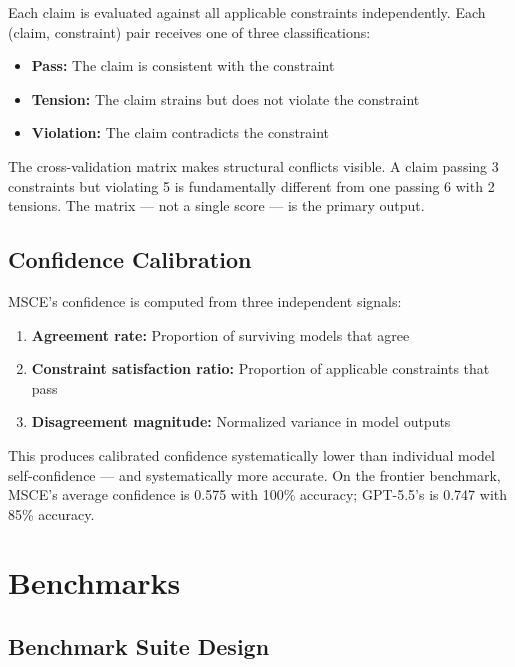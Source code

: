 \documentclass[11pt,a4paper]{article}
\begin{document}
Each claim is evaluated against all applicable constraints independently. Each (claim, constraint) pair receives one of three classifications:

\begin{itemize}
    \item \textbf{Pass:} The claim is consistent with the constraint
    \item \textbf{Tension:} The claim strains but does not violate the constraint
    \item \textbf{Violation:} The claim contradicts the constraint
\end{itemize}

The cross-validation matrix makes structural conflicts visible. A claim passing 3 constraints but violating 5 is fundamentally different from one passing 6 with 2 tensions. The matrix — not a single score — is the primary output.

\subsection{Confidence Calibration}

MSCE's confidence is computed from three independent signals:

\begin{enumerate}
    \item \textbf{Agreement rate:} Proportion of surviving models that agree
    \item \textbf{Constraint satisfaction ratio:} Proportion of applicable constraints that pass
    \item \textbf{Disagreement magnitude:} Normalized variance in model outputs
\end{enumerate}

This produces calibrated confidence systematically lower than individual model self-confidence — and systematically more accurate. On the frontier benchmark, MSCE's average confidence is 0.575 with 100\% accuracy; GPT-5.5's is 0.747 with 85\% accuracy.

\section{Benchmarks}

\subsection{Benchmark Suite Design}
\end{document}
